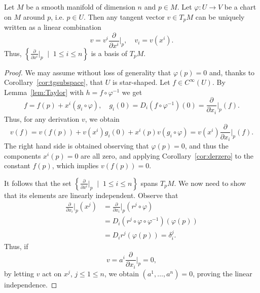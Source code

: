 \begin{proposition}\label{prop:basis_TpM}
  Let $M$ be a smooth manifold of dimension $n$ and $p\in M$.
  Let $\varphi: U \to V$ be a chart on $M$ around $p$, i.e. $p\in U$.
  Then any tangent vector $v\in T_p M$ can be uniquely written as a linear combination
  \begin{equation}
    v = v^i \frac{\partial}{\partial x^i}\Big|_p, \quad v_i = v(x^i).
  \end{equation}
  Thus, $\left\{\frac{\partial}{\partial x^i}\Big|_p\;\mid\; 1\leq i\leq n\right\}$ is a basis of $T_p M$.
\end{proposition}
\begin{proof}
  We may assume without loss of generality that $\varphi(p) = 0$ and, thanks to Corollary~\ref{cor:tgsubspace}, that $U$ is star-shaped.
  Let $f\in C^\infty(U)$.
  By Lemma~\ref{lem:Taylor} with $h = f \circ \varphi^{-1}$ we get
  \begin{equation}
    f = f(p) + x^i (g_i \circ \varphi),
    \quad g_i(0) = D_i (f \circ \varphi^{-1})(0) = \frac{\partial}{\partial x_i}\Big|_p(f).
  \end{equation}
  Thus, for any derivation $v$, we obtain
  \begin{equation}
    v(f) = v(f(p)) + v(x^i)g_i(0) + x^i(p) v(g_i\circ\varphi) = v(x^i)  \frac{\partial}{\partial x_i}\Big|_p(f).
  \end{equation}
  The right hand side is obtained observing that $\varphi(p) = 0$, and thus the components $x^i(p) = 0$ are all zero, and applying Corollary~\ref{cor:derzero} to the constant $f(p)$, which implies $v(f(p)) = 0$.
  
  It follows that the set $\left\{\frac{\partial}{\partial x^i}\Big|_p\;\mid\; 1\leq i\leq n\right\}$ spans $T_p M$.
  We now need to show that its elements are linearly independent.
  Observe that
  \begin{align}
    \frac{\partial}{\partial x_i}\Big|_p (x^j) &= 
    \frac{\partial}{\partial x_i}\Big|_p (r^j \circ \varphi)\\
    &= D_i (r^j \circ \varphi \circ \varphi^{-1}) (\varphi(p))\\
    &= D_i r^j(\varphi(p)) = \delta^j_i.
  \end{align}
  Thus, if
  \begin{equation}
    v = a^i \frac{\partial}{\partial x_i}\Big|_p = 0,
  \end{equation}
  by letting $v$ act on $x^j$, $j\leq 1\leq n$, we obtain $(a^1, \ldots, a^n) = 0$, proving the linear independence.
\end{proof}

